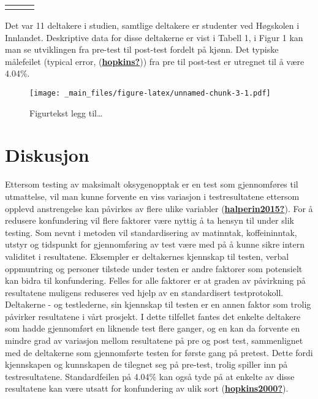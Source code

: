 \documentclass[
]{book}
\begin{document}
\begin{longtable}[c]{|p{1.08in}|p{1.02in}|p{1.02in}}
\noalign{\global\setlength{\arrayrulewidth}{2pt}}\arrayrulecolor[HTML]{666666}\cline{1-3}



\end{longtable}

Det var 11 deltakere i studien, samtlige deltakere er studenter ved
Høgskolen i Innlandet. Deskriptive data for disse deltakerne er vist i
Tabell 1, i Figur 1 kan man se utviklingen fra pre-test til post-test
fordelt på kjønn. Det typiske målefeilet (typical error,
(\protect\hyperlink{ref-hopkins}{\textbf{hopkins?}})) fra pre til
post-test er utregnet til å være 4.04\%.

\begin{figure}
\centering
\texttt{[image: \_main\_files/figure-latex/unnamed-chunk-3-1.pdf]}
\caption{Figurtekst legg til\ldots{}}
\end{figure}

\hypertarget{diskusjon}{%
\section{Diskusjon}\label{diskusjon}}

Ettersom testing av maksimalt oksygenopptak er en test som gjennomføres
til utmattelse, vil man kunne forvente en viss variasjon i
testresultatene ettersom opplevd anstrengelse kan påvirkes av flere
ulike variabler
(\protect\hyperlink{ref-halperin2015}{\textbf{halperin2015?}}). For å
redusere konfundering vil flere faktorer være nyttig å ta hensyn til
under slik testing. Som nevnt i metoden vil standardisering av
matinntak, koffeininntak, utstyr og tidspunkt for gjennomføring av test
være med på å kunne sikre intern validitet i resultatene. Eksempler er
deltakernes kjennskap til testen, verbal oppmuntring og personer
tilstede under testen er andre faktorer som potensielt kan bidra til
konfundering. Felles for alle faktorer er at graden av påvirkning på
resultatene muligens reduseres ved hjelp av en standardisert
testprotokoll. Deltakerne - og testlederne, sin kjennskap til testen er
en annen faktor som trolig påvirker resultatene i vårt prosjekt. I dette
tilfellet fantes det enkelte deltakere som hadde gjennomført en liknende
test flere ganger, og en kan da forvente en mindre grad av variasjon
mellom resultatene på pre og post test, sammenlignet med de deltakerne
som gjennomførte testen for første gang på pretest. Dette fordi
kjennskapen og kunnskapen de tilegnet seg på pre-test, trolig spiller
inn på testresultatene. Standardfeilen på 4.04\% kan også tyde på at
enkelte av disse resultatene kan være utsatt for konfundering av ulik
sort (\protect\hyperlink{ref-hopkins2000}{\textbf{hopkins2000?}}).
\end{document}
